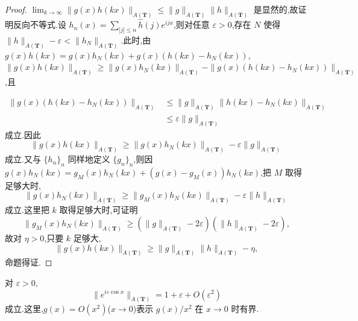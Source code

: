 \begin{proof}
\begin{sloppypar}
$\lim_{k \to \infty}\|g(x)h(kx)\|_{A(\mathbf{T})} \leq \|g\|_{A(\mathbf{T})}\|h\|_{A(\mathbf{T})}$ 是显然的,故证明反向不等式.设 $h_{n}(x) = \sum_{|j| \leq n}\widehat{h}(j)e^{ijx}$,则对任意 $\varepsilon > 0$,存在 $N$ 使得 $\|h\|_{A(\mathbf{T})} - \varepsilon < \|h_{N}\|_{A(\mathbf{T})}$.此时,由 $g(x)h(kx) = g(x)h_{N}(kx) + g(x)(h(kx) - h_{N}(kx))$,
$\|g(x)h(kx)\|_{A(\mathbf{T})} \geq \|g(x)h_{N}(kx)\|_{A(\mathbf{T})} - \|g(x)(h(kx) - h_{N}(kx))\|_{A(\mathbf{T})}$,且
\end{sloppypar}
\begin{align*}
\|g(x)(h(kx) - h_{N}(kx))\|_{A(\mathbf{T})} &\leq \|g\|_{A(\mathbf{T})}\|h(kx) - h_{N}(kx)\|_{A(\mathbf{T})}\\
&\leq \varepsilon\|g\|_{A(\mathbf{T})}
\end{align*}
成立.因此
\begin{equation*}
\|g(x)h(kx)\|_{A(\mathbf{T})} \geq \|g(x)h_{N}(kx)\|_{A(\mathbf{T})} - \varepsilon\|g\|_{A(\mathbf{T})}
\end{equation*}
成立.又与 $\{h_{n}\}_{n}$ 同样地定义 $\{g_{n}\}_{n}$,则因 $g(x)h_{N}(kx) = g_{M}(x)h_{N}(kx) + (g(x) - g_{M}(x))h_{N}(kx)$,把 $M$ 取得足够大时,
\begin{equation*}
\|g(x)h_{N}(kx)\|_{A(\mathbf{T})} \geq \|g_{M}(x)h_{N}(kx)\|_{A(\mathbf{T})} - \varepsilon\|h\|_{A(\mathbf{T})}
\end{equation*}
成立.这里把 $k$ 取得足够大时,可证明
\begin{equation*}
\|g_{M}(x)h_{N}(kx)\|_{A(\mathbf{T})} \geq (\|g\|_{A(\mathbf{T})} - 2\varepsilon)(\|h\|_{A(\mathbf{T})} - 2\varepsilon),
\end{equation*}
故对 $\eta > 0$,只要 $k$ 足够大,
\begin{equation*}
\|g(x)h(kx)\|_{A(\mathbf{T})} \geq \|g\|_{A(\mathbf{T})}\|h\|_{A(\mathbf{T})} - \eta,
\end{equation*}
命题得证.
\end{proof}

\begin{lemma}\label{lem:3.5.6}
对 $\varepsilon > 0$,
\begin{equation*}
\|e^{i\varepsilon\cos x}\|_{A(\mathbf{T})} = 1 + \varepsilon + O(\varepsilon^{2})
\end{equation*}
成立.这里,$g(x) = O(x^{2})$($x \to 0$)表示 $g(x)/x^{2}$ 在 $x \to 0$ 时有界.
\end{lemma}

